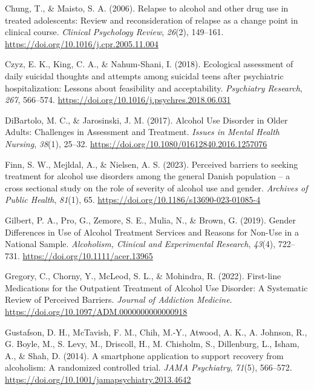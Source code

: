 \documentclass[
  letterpaper,
  DIV=11,
  numbers=noendperiod]{scrartcl}
\newlength{\cslhangindent}
\newenvironment{CSLReferences}[2] %
 {\begin{list}{}{%
  \setlength{\itemindent}{0pt}
  \setlength{\leftmargin}{0pt}
  \setlength{\parsep}{0pt}
  \ifodd #1
   \setlength{\leftmargin}{\cslhangindent}
   \setlength{\itemindent}{-1\cslhangindent}
  \fi
  \setlength{\itemsep}{#2\baselineskip}}}
 {\end{list}}
\begin{document}
\begin{CSLReferences}{1}{0}
Chung, T., \& Maisto, S. A. (2006). Relapse to alcohol and other drug
use in treated adolescents: {Review} and reconsideration of relapse as a
change point in clinical course. \emph{Clinical Psychology Review},
\emph{26}(2), 149--161. \url{https://doi.org/10.1016/j.cpr.2005.11.004}

Czyz, E. K., King, C. A., \& Nahum-Shani, I. (2018). Ecological
assessment of daily suicidal thoughts and attempts among suicidal teens
after psychiatric hospitalization: {Lessons} about feasibility and
acceptability. \emph{Psychiatry Research}, \emph{267}, 566--574.
\url{https://doi.org/10.1016/j.psychres.2018.06.031}

DiBartolo, M. C., \& Jarosinski, J. M. (2017). Alcohol {Use Disorder} in
{Older Adults}: {Challenges} in {Assessment} and {Treatment}.
\emph{Issues in Mental Health Nursing}, \emph{38}(1), 25--32.
\url{https://doi.org/10.1080/01612840.2016.1257076}

Finn, S. W., Mejldal, A., \& Nielsen, A. S. (2023). Perceived barriers
to seeking treatment for alcohol use disorders among the general
{Danish} population -- a cross sectional study on the role of severity
of alcohol use and gender. \emph{Archives of Public Health},
\emph{81}(1), 65. \url{https://doi.org/10.1186/s13690-023-01085-4}

Gilbert, P. A., Pro, G., Zemore, S. E., Mulia, N., \& Brown, G. (2019).
Gender {Differences} in {Use} of {Alcohol Treatment Services} and
{Reasons} for {Non-Use} in a {National Sample}. \emph{Alcoholism,
Clinical and Experimental Research}, \emph{43}(4), 722--731.
\url{https://doi.org/10.1111/acer.13965}

Gregory, C., Chorny, Y., McLeod, S. L., \& Mohindra, R. (2022).
First-line {Medications} for the {Outpatient Treatment} of {Alcohol Use
Disorder}: {A Systematic Review} of {Perceived Barriers}. \emph{Journal
of Addiction Medicine}.
\url{https://doi.org/10.1097/ADM.0000000000000918}

Gustafson, D. H., McTavish, F. M., Chih, M.-Y., Atwood, A. K., A.
Johnson, R., G. Boyle, M., S. Levy, M., Driscoll, H., M. Chisholm, S.,
Dillenburg, L., Isham, A., \& Shah, D. (2014). A smartphone application
to support recovery from alcoholism: {A} randomized controlled trial.
\emph{JAMA Psychiatry}, \emph{71}(5), 566--572.
\url{https://doi.org/10.1001/jamapsychiatry.2013.4642}


\end{CSLReferences}
\end{document}
